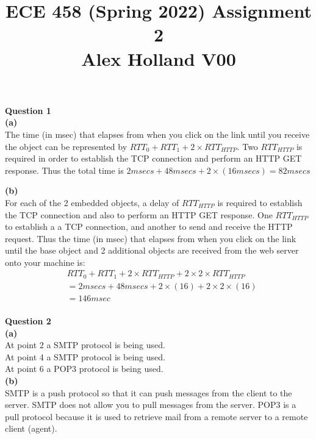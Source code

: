 \documentclass{article}
\title{%
   ECE 458 (Spring 2022) Assignment 2 \\
   \large Alex Holland V00}
\date{}
\begin{document}
\maketitle

{\bf Question 1}\\
{\bf (a)}\\
The time (in msec) that elapses from when you click on the link until you receive the object can be represented by $RTT_0+RTT_1+2 \times RTT_{HTTP}$. Two $RTT_{HTTP}$ is required in order to establish the TCP connection and perform an HTTP GET response. Thus the total time is $2msecs+48msecs+2 \times (16msecs)=82msecs$

\bigskip
{\bf (b)}\\
For each of the 2 embedded objects, a delay of $RTT_{HTTP}$ is required to establish the TCP connection and also to perform an HTTP GET response. One $RTT_{HTTP}$ to establish a a TCP connection, and another to send and receive the HTTP request. Thus the time (in msec) that elapses from when you click on the link until the base object and 2 additional objects are received from the web server onto your machine is:
\begin{equation*}
    \begin{split}
        & RTT_0+RTT_1+2 \times RTT_{HTTP}+2 \times 2 \times RTT_{HTTP}\\
        &= 2msecs+48msecs+2 \times (16)+2 \times 2 \times (16)\\
        &= 146msec\\
    \end{split}
\end{equation*}

{\bf Question 2}\\
{\bf (a)}\\
At point 2 a SMTP protocol is being used.\\
At point 4 a SMTP protocol is being used.\\
At point 6 a POP3 protocol is being used.\\

\smallskip
{\bf (b)}\\
SMTP is a push protocol so that it can push messages from the client to the server. SMTP does not allow you to pull messages from the server. POP3 is a pull protocol because it is used to retrieve mail from a remote server to a remote client (agent).
\end{document}

